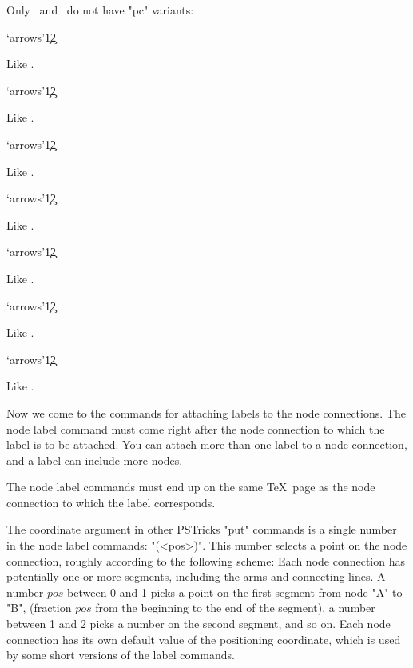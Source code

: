 Only \n\ncLine\ and \n\nccircle\ do not have "pc" variants:
\begin{description}

\oitem  \pcline`{arrows}'\c1\c2

  Like \n\ncline.

\oitem  \pccurve`{arrows}'\c1\c2

  Like \n\nccurve.

\oitem  \pcarc`{arrows}'\c1\c2

  Like \n\ncarc.

\oitem  \pcbar`{arrows}'\c1\c2

  Like \n\ncbar.

\oitem  \pcdiag`{arrows}'\c1\c2

  Like \n\ncdiag.

\oitem  \pcangle`{arrows}'\c1\c2

  Like \n\ncangle.

\oitem  \pcloop`{arrows}'\c1\c2

  Like \n\ncloop.

\end{description}



Now we come to the commands for attaching labels to the node connections. The
node label command must come right after the node connection to which the
label is to be attached. You can attach more than one label to a node
connection, and a label can include more nodes.

The node label commands must end up on the same \TeX\ page as the node
connection to which the label corresponds.

The coordinate argument in other PSTricks "put" commands is a single number in
the node label commands: "(<pos>)".  This number selects a point on the node
connection, roughly according to the following scheme: Each node connection
has potentially one or more segments, including the arms and connecting lines.
A number $pos$ between 0 and 1 picks a point on the first segment from node
"A" to "B", (fraction $pos$ from the beginning to the end of the segment), a
number between 1 and 2 picks a number on the second segment, and so on. Each
node connection has its own default value of the positioning coordinate, which
is used by some short versions of the label commands.

